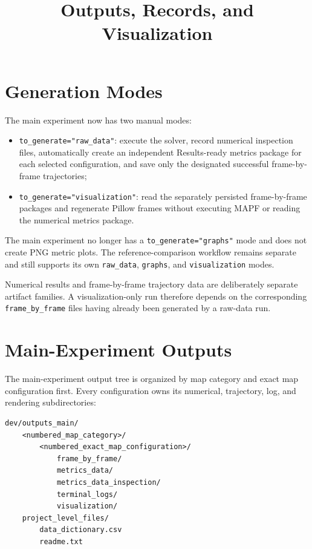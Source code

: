 \documentclass[11pt]{article}
\title{Outputs, Records, and Visualization}
\author{}
\date{}
\begin{document}
\maketitle

\section{Generation Modes}

The main experiment now has two manual modes:
\begin{itemize}[leftmargin=2em]
    \item \texttt{to\_generate="raw\_data"}: execute the solver, record numerical inspection files, automatically create an independent Results-ready metrics package for each selected configuration, and save only the designated successful frame-by-frame trajectories;
    \item \texttt{to\_generate="visualization"}: read the separately persisted frame-by-frame packages and regenerate Pillow frames without executing MAPF or reading the numerical metrics package.
\end{itemize}

The main experiment no longer has a \texttt{to\_generate="graphs"} mode and does not create PNG metric plots. The reference-comparison workflow remains separate and still supports its own \texttt{raw\_data}, \texttt{graphs}, and \texttt{visualization} modes.

Numerical results and frame-by-frame trajectory data are deliberately separate artifact families. A visualization-only run therefore depends on the corresponding \texttt{frame\_by\_frame} files having already been generated by a raw-data run.

\section{Main-Experiment Outputs}

The main-experiment output tree is organized by map category and exact map configuration first. Every configuration owns its numerical, trajectory, log, and rendering subdirectories:
\begin{lstlisting}
dev/outputs_main/
    <numbered_map_category>/
        <numbered_exact_map_configuration>/
            frame_by_frame/
            metrics_data/
            metrics_data_inspection/
            terminal_logs/
            visualization/
    project_level_files/
        data_dictionary.csv
        readme.txt
\end{lstlisting}
\end{document}
